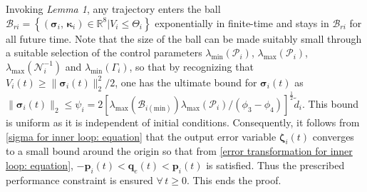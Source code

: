 \documentclass[lettersize,journal]{IEEEtran}
\begin{document}
Invoking \textit{Lemma 1}, any trajectory enters the ball $\mathcal{B}_{r i} = \left \{ \left ( \boldsymbol{\sigma}_i, \, \boldsymbol{\kappa}_i \right ) \in \mathbb{R}^8 | V_i \leq \Theta_i \right\}$ exponentially in finite-time and stays in $\mathcal{B}_{r i}$ for all future time. Note that the size of the ball can be made suitably small through a suitable selection of the control parameters $\lambda_{\text{min}}(\mathcal{P}_i)$, $\lambda_{\text{max}}(\mathcal{P}_i)$, $\lambda_{\text{max}}(\mathcal{N}_i^{-1}) $ and $\lambda_{\text{min}}(\Gamma_i)$, so that by recognizing that $V_i(t) \geq \lVert \boldsymbol{\sigma}_i(t) \rVert_2^2/2$, one has the ultimate bound for $\boldsymbol{\sigma}_i(t)$ as $\lVert \boldsymbol{\sigma}_i(t) \rVert_2 \leq \psi_i = 2 \left[\lambda_{\text{max}}(\mathcal{B}_{i(\text{min})})\lambda_{\text{max}}(\mathcal{P}_i)/\left(\phi_3 - \phi_4\right)\right]^{\frac{1}{2}}  \tilde{d}_{i}$. This bound is uniform as it is independent of initial conditions. 
Consequently, it follows from \eqref{sigma for inner loop: equation} that the output error variable $\boldsymbol{\zeta}_i(t)$ converges to a small bound around the origin so that from \eqref{error transformation for inner loop: equation}, $- \boldsymbol{p}_{i}(t) < \boldsymbol{q}_{e}(t) < \boldsymbol{p}_{i}(t)$ is satisfied. Thus the prescribed performance constraint is ensured $\forall \, t \geq 0$. This ends the proof.
\end{document}
